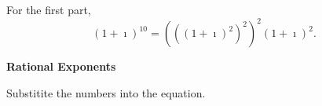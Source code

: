 {%
\begin{Hint}
  \label{hint (1+i)10}
  For the first part,
  \[
  (1 + \imath)^{10} = \left( \left( (1 + \imath)^2 \right)^2 \right)^2 (1 + \imath)^2.
  \]
\end{Hint}



\begin{large}
  \noindent
  \textbf{Rational Exponents}
\end{large}




\begin{Hint}
  \label{hint z2 + 2az + b = 0}
  Substitite the numbers into the equation.
\end{Hint}


























\raggedbottom
}
